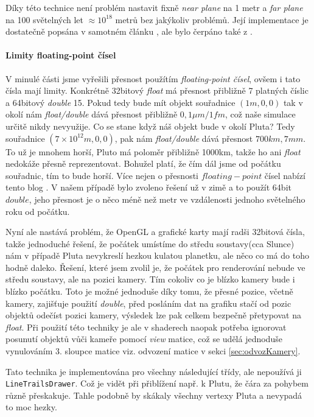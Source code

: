 Díky této technice není problém nastavit fixně \textit{near plane} na 1 metr a \textit{far plane} na 100 světelných let $ \approx 10^{18} $ metrů bez jakýkoliv problémů.
Její implementace je dostatečně popsána v samotném článku \cite{revBuff}, ale bylo čerpáno také z \cite{implRevBuff}.

\paragraph{Limity floating-point čísel}
V minulé části jsme vyřešili přesnost použítím \textit{floating-point čísel}, ovšem i tato čísla mají limity. Konkrétně 32bitový \textit{float} má přesnost přibližně 7 platných číslic a 64bitový \textit{double} 15. Pokud tedy bude mít objekt souřadnice $ (1m,0,0) $ tak v okolí nám \textit{float/double} dává přesnost přibližně $ 0,1 \mu m / 1fm$, což naše simulace určitě nikdy nevyužije. Co se stane když náš objekt bude v okolí Pluta? Tedy souřadnice $ (7\times10^{12}m,0,0) $, pak nám \textit{float/double} dává přesnost $ 700km,7mm $. To už je mnohem horší, Pluto má poloměr přibližně 1000km, takže ho ani \textit{float} nedokáže přesně reprezentovat. Bohužel platí, že čím dál jsme od počátku souřadnic, tím to bude horší. Více nejen o přesnosti $ floating-point $ čísel nabízí tento blog \cite{floatBlog}. V našem případě bylo zvoleno řešení už v zimě a to použít 64bit $ double $, jeho přesnost je o něco méně než metr ve vzdálenosti jednoho světelného roku od počátku.

Nyní ale nastává problém, že OpenGL a grafické karty mají radši 32bitová čísla, takže jednoduché řešení, že počátek umístíme do středu soustavy(cca Slunce) nám v případě Pluta nevykreslí hezkou kulatou planetku, ale něco co má do toho hodně daleko. Řešení, které jsem zvolil je, že počátek pro renderování nebude ve středu soustavy, ale na pozici kamery. Tím cokoliv co je blízko kamery bude i blízko počátku. Toto je možné jednoduše díky tomu, že přesné pozice, včetně kamery, zajišťuje použití \textit{double}, před posláním dat na grafiku stačí od pozic objektů odečíst pozici kamery, výsledek lze pak celkem bezpečně přetypovat na \textit{float}. Při použití této techniky je ale v shaderech naopak potřeba ignorovat posunutí objektů vůči kameře pomocí \textit{view} matice, což se udělá jednoduše vynulováním 3. sloupce matice viz. odvození matice v sekci \ref{sec:odvozKamery}.

Tato technika je implementována pro všechny následující třídy, ale nepoužívá ji \texttt{LineTrailsDrawer}. Což je vidět při přiblížení např. k Plutu, že čára za pohybem různě přeskakuje. Tahle podobně by skákaly všechny vertexy Pluta a nevypadá to moc hezky.

